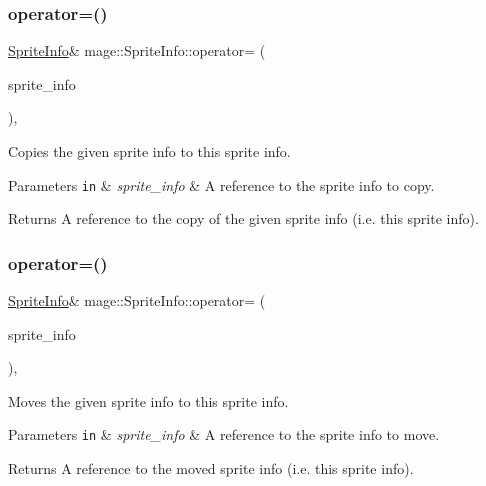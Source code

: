 \subsubsection{\texorpdfstring{operator=()}{operator=()}\hspace{0.1cm}{\footnotesize\ttfamily [1/2]}}
{\footnotesize\ttfamily \hyperlink{structmage_1_1_sprite_info}{Sprite\+Info}\& mage\+::\+Sprite\+Info\+::operator= (\begin{DoxyParamCaption}\item[{const \hyperlink{structmage_1_1_sprite_info}{Sprite\+Info} \&}]{sprite\+\_\+info }\end{DoxyParamCaption})\hspace{0.3cm}{\ttfamily [default]}, {\ttfamily [noexcept]}}

Copies the given sprite info to this sprite info.


\begin{DoxyParams}[1]{Parameters}
\mbox{\tt in}  & {\em sprite\+\_\+info} & A reference to the sprite info to copy. \\
\hline
\end{DoxyParams}
\begin{DoxyReturn}{Returns}
A reference to the copy of the given sprite info (i.\+e. this sprite info). 
\end{DoxyReturn}
\hypertarget{structmage_1_1_sprite_info_a53a281b4e379f7cedd63027915929cf9}{}\label{structmage_1_1_sprite_info_a53a281b4e379f7cedd63027915929cf9} 
\subsubsection{\texorpdfstring{operator=()}{operator=()}\hspace{0.1cm}{\footnotesize\ttfamily [2/2]}}
{\footnotesize\ttfamily \hyperlink{structmage_1_1_sprite_info}{Sprite\+Info}\& mage\+::\+Sprite\+Info\+::operator= (\begin{DoxyParamCaption}\item[{\hyperlink{structmage_1_1_sprite_info}{Sprite\+Info} \&\&}]{sprite\+\_\+info }\end{DoxyParamCaption})\hspace{0.3cm}{\ttfamily [default]}, {\ttfamily [noexcept]}}

Moves the given sprite info to this sprite info.


\begin{DoxyParams}[1]{Parameters}
\mbox{\tt in}  & {\em sprite\+\_\+info} & A reference to the sprite info to move. \\
\hline
\end{DoxyParams}
\begin{DoxyReturn}{Returns}
A reference to the moved sprite info (i.\+e. this sprite info). 
\end{DoxyReturn}


